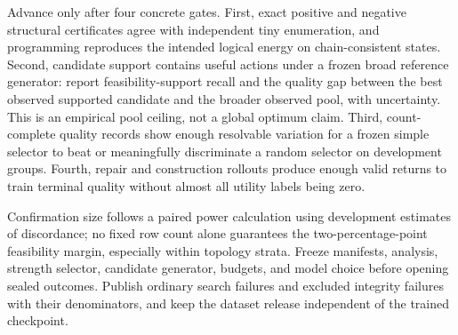 Advance only after four concrete gates. First, exact positive and negative structural certificates agree with independent tiny enumeration, and programming reproduces the intended logical energy on chain-consistent states. Second, candidate support contains useful actions under a frozen broad reference generator: report feasibility-support recall and the quality gap between the best observed supported candidate and the broader observed pool, with uncertainty. This is an empirical pool ceiling, not a global optimum claim. Third, count-complete quality records show enough resolvable variation for a frozen simple selector to beat or meaningfully discriminate a random selector on development groups. Fourth, repair and construction rollouts produce enough valid returns to train terminal quality without almost all utility labels being zero.

Confirmation size follows a paired power calculation using development estimates of discordance; no fixed row count alone guarantees the two-percentage-point feasibility margin, especially within topology strata. Freeze manifests, analysis, strength selector, candidate generator, budgets, and model choice before opening sealed outcomes. Publish ordinary search failures and excluded integrity failures with their denominators, and keep the dataset release independent of the trained checkpoint.
